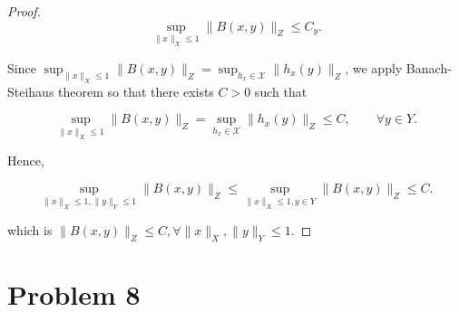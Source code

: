\documentclass[12pt]{article}
\begin{document}
\begin{enumerate}
\begin{proof}
$$
\sup_{\|x\|_X \leqslant 1} \|B(x, y)\|_Z \leqslant C_y.
$$

Since $\sup_{\|x\|_X \leqslant 1} \|B(x, y)\|_Z = \sup_{h_x\in \mathcal X} \|h_x(y)\|_Z$, we apply Banach-Steihaus theorem so that there exists $C> 0$ such that 

$$
\sup_{\|x\|_X \leqslant 1} \|B(x, y)\|_Z = \sup_{h_x\in \mathcal X} \|h_x(y)\|_Z \leqslant C, \qquad \forall y\in Y.
$$

Hence, 

$$
\sup_{\|x\|_X \leqslant 1, \|y\|_Y\leqslant 1} \|B(x, y)\|_Z \leqslant \sup_{\|x\|_X \leqslant 1, y\in Y} \|B(x, y)\|_Z \leqslant C.
$$

which is $\|B(x, y)\|_Z \leqslant C, \forall \|x\|_X, \|y\|_Y \leqslant1.$


\end{proof}



\end{enumerate}


\section*{Problem 8}
\end{document}
